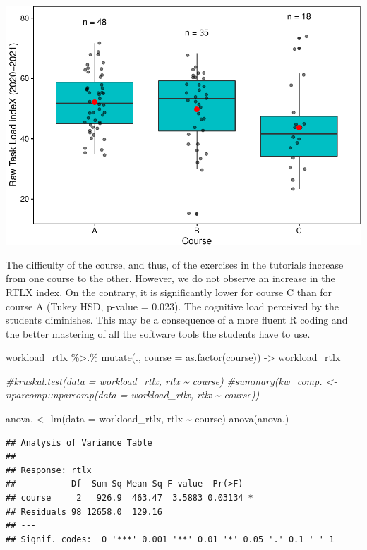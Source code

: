 \documentclass[
]{article}
\newenvironment{Shaded}{\begin{snugshade}}{\end{snugshade}}
\newcommand{\AttributeTok}[1]{\textcolor[rgb]{0.77,0.63,0.00}{#1}}
\newcommand{\CommentTok}[1]{\textcolor[rgb]{0.56,0.35,0.01}{\textit{#1}}}
\newcommand{\FunctionTok}[1]{\textcolor[rgb]{0.00,0.00,0.00}{#1}}
\newcommand{\NormalTok}[1]{#1}
\newcommand{\OtherTok}[1]{\textcolor[rgb]{0.56,0.35,0.01}{#1}}
\newcommand{\SpecialCharTok}[1]{\textcolor[rgb]{0.00,0.00,0.00}{#1}}
\begin{document}
\includegraphics{teaching_data_science_files/figure-latex/unnamed-chunk-5-1.pdf}

The difficulty of the course, and thus, of the exercises in the
tutorials increase from one course to the other. However, we do not
observe an increase in the RTLX index. On the contrary, it is
significantly lower for course C than for course A (Tukey HSD, p-value =
0.023). The cognitive load perceived by the students diminishes. This
may be a consequence of a more fluent R coding and the better mastering
of all the software tools the students have to use.

\begin{Shaded}
\begin{Highlighting}[]
\NormalTok{workload\_rtlx }\SpecialCharTok{\%\textgreater{}.\%}
  \FunctionTok{mutate}\NormalTok{(., }\AttributeTok{course =} \FunctionTok{as.factor}\NormalTok{(course)) }\OtherTok{{-}\textgreater{}}\NormalTok{ workload\_rtlx}

\CommentTok{\#kruskal.test(data = workload\_rtlx, rtlx \textasciitilde{} course)}
\CommentTok{\#summary(kw\_comp. \textless{}{-} nparcomp::nparcomp(data = workload\_rtlx, rtlx \textasciitilde{} course))}

\NormalTok{anova. }\OtherTok{\textless{}{-}} \FunctionTok{lm}\NormalTok{(}\AttributeTok{data =}\NormalTok{ workload\_rtlx, rtlx }\SpecialCharTok{\textasciitilde{}}\NormalTok{ course)}
\FunctionTok{anova}\NormalTok{(anova.)}
\end{Highlighting}
\end{Shaded}

\begin{verbatim}
## Analysis of Variance Table
## 
## Response: rtlx
##           Df  Sum Sq Mean Sq F value  Pr(>F)  
## course     2   926.9  463.47  3.5883 0.03134 *
## Residuals 98 12658.0  129.16                  
## ---
## Signif. codes:  0 '***' 0.001 '**' 0.01 '*' 0.05 '.' 0.1 ' ' 1
\end{verbatim}
\end{document}
